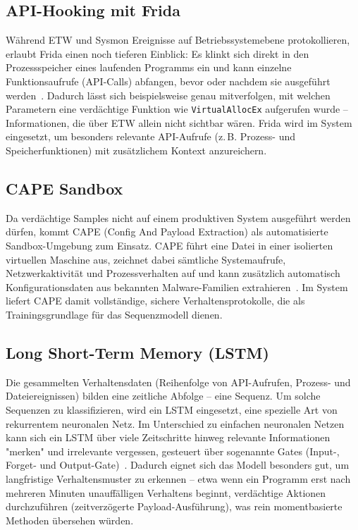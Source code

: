 \subsection{API-Hooking mit Frida}

Während \ac{ETW} und \ac{Sysmon} Ereignisse auf Betriebssystemebene
protokollieren, erlaubt Frida einen noch tieferen Einblick: Es klinkt
sich direkt in den Prozessspeicher eines laufenden Programms ein und
kann einzelne Funktionsaufrufe (\ac{API}-Calls) abfangen, bevor oder
nachdem sie ausgeführt werden~\cite{frida-docs}. Dadurch lässt sich
beispielsweise genau mitverfolgen, mit welchen Parametern eine
verdächtige Funktion wie \texttt{VirtualAllocEx} aufgerufen wurde --
Informationen, die über \ac{ETW} allein nicht sichtbar wären. Frida
wird im System eingesetzt, um besonders relevante \ac{API}-Aufrufe
(z.\,B. Prozess- und Speicherfunktionen) mit zusätzlichem Kontext
anzureichern.

\subsection{CAPE Sandbox}

Da verdächtige Samples nicht auf einem produktiven System ausgeführt
werden dürfen, kommt \ac{CAPE} (Config And Payload Extraction) als
automatisierte Sandbox-Umgebung zum Einsatz. \ac{CAPE} führt eine Datei
in einer isolierten virtuellen Maschine aus, zeichnet dabei sämtliche
Systemaufrufe, Netzwerkaktivität und Prozessverhalten auf und kann
zusätzlich automatisch Konfigurationsdaten aus bekannten
Malware-Familien extrahieren~\cite{cape-sandbox}. Im System liefert
\ac{CAPE} damit vollständige, sichere Verhaltensprotokolle, die als
Trainingsgrundlage für das Sequenzmodell dienen.

\subsection{Long Short-Term Memory (LSTM)}

Die gesammelten Verhaltensdaten (Reihenfolge von \ac{API}-Aufrufen,
Prozess- und Dateiereignissen) bilden eine zeitliche Abfolge -- eine
Sequenz. Um solche Sequenzen zu klassifizieren, wird ein \ac{LSTM}
eingesetzt, eine spezielle Art von rekurrentem neuronalen Netz. Im
Unterschied zu einfachen neuronalen Netzen kann sich ein \ac{LSTM} über
viele Zeitschritte hinweg relevante Informationen "merken" und
irrelevante vergessen, gesteuert über sogenannte Gates (Input-, Forget-
und Output-Gate)~\cite{lstm-paper}. Dadurch eignet sich das Modell
besonders gut, um langfristige Verhaltensmuster zu erkennen -- etwa
wenn ein Programm erst nach mehreren Minuten unauffälligen Verhaltens
beginnt, verdächtige Aktionen durchzuführen (zeitverzögerte
Payload-Ausführung), was rein momentbasierte Methoden übersehen würden.

